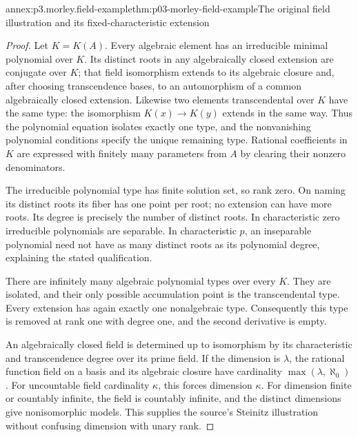 \begin{annexitem}{annex:p3.morley.field-example}{thm:p03-morley-field-example}{The original field illustration and its fixed-characteristic extension}
\begin{proof}
Let \(K=K(A)\). Every algebraic element has an irreducible
minimal polynomial over \(K\). Its distinct roots in any
algebraically closed extension are conjugate over \(K\);
that field isomorphism extends to its algebraic closure
and, after choosing transcendence bases, to an automorphism
of a common algebraically closed extension. Likewise two
elements transcendental over \(K\) have the same type:
the isomorphism \(K(x)\to K(y)\) extends in the same way.
Thus the polynomial equation isolates exactly one type,
and the nonvanishing polynomial conditions specify the
unique remaining type. Rational coefficients in \(K\)
are expressed with finitely many parameters from \(A\)
by clearing their nonzero denominators.

The irreducible polynomial type has finite solution set,
so rank zero. On naming its distinct roots its fiber has
one point per root; no extension can have more roots.
Its degree is precisely the number of distinct roots.
In characteristic zero irreducible polynomials are
separable. In characteristic \(p\), an inseparable
polynomial need not have as many distinct roots as its
polynomial degree, explaining the stated qualification.

There are infinitely many algebraic polynomial types over
every \(K\). They are isolated, and their only possible
accumulation point is the transcendental type. Every
extension has again exactly one nonalgebraic type.
Consequently this type is removed at rank one with degree
one, and the second derivative is empty.

An algebraically closed field is determined up to
isomorphism by its characteristic and transcendence
degree over its prime field. If the dimension is
\(\lambda\), the rational function field on a basis
and its algebraic closure have cardinality
\(\max(\lambda,\aleph_0)\). For uncountable field
cardinality \(\kappa\), this forces dimension
\(\kappa\). For dimension finite or countably infinite,
the field is countably infinite, and the distinct
dimensions give nonisomorphic models. This supplies the
source's Steinitz illustration without confusing
dimension with unary rank.
\end{proof}
\end{annexitem}


